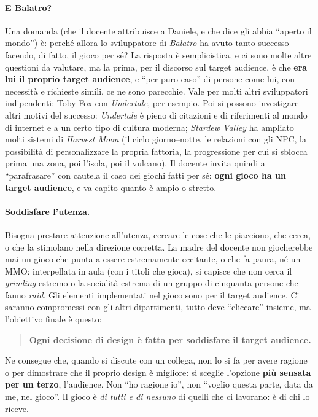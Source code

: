 \paragraph{E Balatro?} Una domanda (che il docente attribuisce a Daniele, e
che dice gli abbia ``aperto il mondo'') è: perché allora lo sviluppatore di
\emph{Balatro} ha avuto tanto successo facendo, di fatto, il gioco per sé? La
risposta è semplicistica, e ci sono molte altre questioni da valutare, ma la
prima, per il discorso sul target audience, è che \textbf{era lui il proprio
target audience}, e ``per puro caso'' di persone come lui, con necessità e
richieste simili, ce ne sono parecchie. Vale per molti altri sviluppatori
indipendenti: Toby Fox con \emph{Undertale}, per esempio. Poi si possono
investigare altri motivi del successo: \emph{Undertale} è pieno di citazioni e
di riferimenti al mondo di internet e a un certo tipo di cultura moderna;
\emph{Stardew Valley} ha ampliato molti sistemi di \emph{Harvest Moon} (il
ciclo giorno--notte, le relazioni con gli NPC, la possibilità di
personalizzare la propria fattoria, la progressione per cui si sblocca prima
una zona, poi l'isola, poi il vulcano). Il docente invita quindi a
``parafrasare'' con cautela il caso dei giochi fatti per sé: \textbf{ogni gioco
ha un target audience}, e va capito quanto è ampio o stretto.

\paragraph{Soddisfare l'utenza.} Bisogna prestare attenzione all'utenza,
cercare le cose che le piacciono, che cerca, o che la stimolano nella
direzione corretta. La madre del docente non giocherebbe mai un gioco che
punta a essere estremamente eccitante, o che fa paura, né un MMO: interpellata
in aula (con i titoli che gioca), si capisce che non cerca il \emph{grinding}
estremo o la socialità estrema di un gruppo di cinquanta persone che fanno
\emph{raid}. Gli elementi implementati nel gioco sono per il target audience.
Ci saranno compromessi con gli altri dipartimenti, tutto deve ``cliccare''
insieme, ma l'obiettivo finale è questo:

\begin{quote}
\centering
\textbf{Ogni decisione di design è fatta per soddisfare il target audience.}
\end{quote}

Ne consegue che, quando si discute con un collega, non lo si fa per avere
ragione o per dimostrare che il proprio design è migliore: si sceglie
l'opzione \textbf{più sensata per un terzo}, l'audience. Non ``ho ragione io'',
non ``voglio questa parte, data da me, nel gioco''. Il gioco è \emph{di tutti
e di nessuno} di quelli che ci lavorano: è di chi lo riceve.

